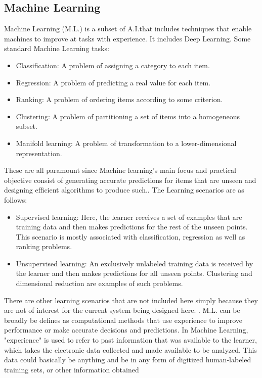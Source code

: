 \subsection{Machine Learning}
Machine Learning (M.L.) is a subset of A.I.that includes techniques that enable machines to improve at tasks with experience. It includes Deep Learning.
Some standard Machine Learning tasks:
\begin{itemize}
    \item Classification: A problem of assigning a category to each item.
    \item Regression: A problem of predicting a real value for each item.
    \item Ranking: A problem of ordering items according to some criterion.
    \item Clustering: A problem of partitioning a set of items into a homogeneous subset.
    \item Manifold learning: A problem of transformation to a lower-dimensional representation.
\end{itemize}
These are all paramount since Machine learning's main focus and practical objective consist of generating accurate predictions for items that are unseen and designing efficient algorithms to produce such.\vspace{5mm}.
The Learning scenarios are as follows:
\begin{itemize}
    \item Supervised learning: Here, the learner receives a set of examples that are training data and then makes predictions for the rest of the unseen points. This scenario is mostly associated with classification, regression as well as ranking problems. 
    \item Unsupervised learning: An exclusively unlabeled training data is received by the learner and then makes predictions for all unseen points. Clustering and dimensional reduction are examples of such problems.
\end{itemize}
There are other learning scenarios that are not included here simply because they are not of interest for the current system being designed here.
\vspace{5mm}.
M.L. can be broadly be defines as computational methods that use experience to improve performance or make accurate decisions and predictions. In Machine Learning, "experience" is used to refer to past information that was available to the learner, which takes the electronic data collected and made available to be analyzed. This data could basically be anything and be in any form of digitized human-labeled training sets, or other information obtained
